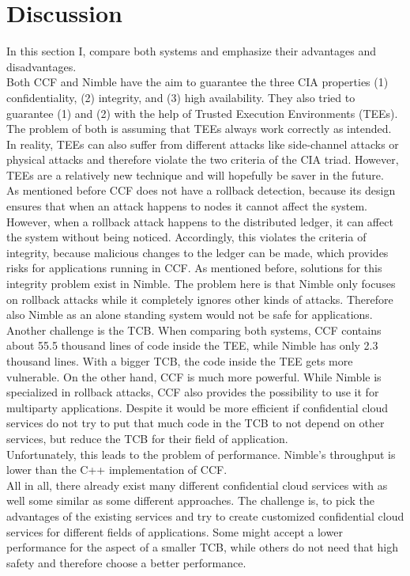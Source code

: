 \section{Discussion}
\label{challenges:ccf}
In this section I, compare both systems and emphasize their advantages and disadvantages.\\
Both CCF and Nimble have the aim to guarantee the three CIA properties (1) confidentiality, (2) integrity, and (3) high availability. They also tried to guarantee (1) and (2) with the help of Trusted Execution Environments (TEEs). The problem of both is assuming that TEEs always work correctly as intended. In reality, TEEs can also suffer from different attacks like side-channel attacks or physical attacks and therefore violate the two criteria of the CIA triad. However, TEEs are a relatively new technique and will hopefully be saver in the future.\\
As mentioned before CCF does not have a rollback detection, because its design ensures that when an attack happens to nodes it cannot affect the system. However, when a rollback attack happens to the distributed ledger, it can affect the system without being noticed. Accordingly, this violates the criteria of integrity, because malicious changes to the ledger can be made, which provides risks for applications running in CCF.
As mentioned before, solutions for this integrity problem exist in Nimble. The problem here is that Nimble only focuses on rollback attacks while it completely ignores other kinds of attacks. Therefore also Nimble as an alone standing system would not be safe for applications.\\
Another challenge is the TCB. When comparing both systems, CCF contains about 55.5 thousand lines of code inside the TEE, while Nimble has only 2.3 thousand lines. With a bigger TCB, the code inside the TEE gets more vulnerable. On the other hand, CCF is much more powerful. While Nimble is specialized in rollback attacks, CCF also provides the possibility to use it for multiparty applications.  Despite it would be more efficient if confidential cloud services do not try to put that much code in the TCB to not depend on other services, but reduce the TCB for their field of application.\\
 Unfortunately, this leads to the problem of performance. Nimble's throughput is lower than the C++ implementation of CCF. \\
All in all, there already exist many different confidential cloud services with as well some similar as some different approaches. The challenge is, to pick the advantages of the existing services and try to create customized confidential cloud services for different fields of applications. Some might accept a lower performance for the aspect of a smaller TCB, while others do not need that high safety and therefore choose a better performance.  